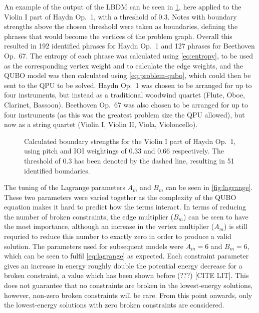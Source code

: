 \documentclass[12pt]{article}
\theoremstyle{definition}
\begin{document}
An example of the output of the LBDM can be seen in \cref{fig:phrase-extraction}, here applied to the Violin I part of Haydn Op.\ 1, with a threshold of \num{0.3}. Notes with boundary strengths above the chosen threshold were taken as boundaries, defining the phrases that would become the vertices of the problem graph. Overall this resulted in \num{192} identified phrases for Haydn Op.\ 1 and \num{127} phrases for Beethoven Op.\ 67. The entropy of each phrase was calculated using \cref{eq:entropy}, to be used as the corresponding vertex weight and to calculate the edge weights, and the QUBO model was then calculated using \cref{eq:problem-qubo}, which could then be sent to the QPU to be solved. Haydn Op.\ 1 was chosen to be arranged for up to four instruments, but instead as a traditional woodwind quartet (Flute, Oboe, Clarinet, Bassoon). Beethoven Op.\ 67 was also chosen to be arranged for up to four instruments (as this was the greatest problem size the QPU allowed), but now as a string quartet (Violin I, Violin II, Viola, Violoncello).

\begin{figure}[h]
    \small
    
    \caption{Calculated boundary strengths for the Violin I part of Haydn Op.\ 1, using pitch and IOI weightings of \num{0.33} and \num{0.66} respectively. The threshold of \num{0.3} has been denoted by the dashed line, resulting in \num{51} identified boundaries.}
    \label{fig:phrase-extraction}
\end{figure}

The tuning of the Lagrange parameters $A_m$ and $B_m$ can be seen in \cref{fig:lagrange}. These two parameters were varied together as the complexity of the QUBO equation makes it hard to predict how the terms interact. In terms of reducing the number of broken constraints, the edge multiplier ($B_m$) can be seen to have the most importance, although an increase in the vertex multiplier ($A_m$) is still requried to reduce this number to exactly zero in order to produce a valid solution. The parameters used for subsequent models were $A_m=6$ and $B_m=6$, which can be seen to fulfil \cref{eq:lagrange} as expected. Each constraint parameter gives an increase in energy roughly double the potential energy decrease for a broken constraint, a value which has been shown before (???) [CITE LIT]. This does not guarantee that no constraints are broken in the lowest-energy solutions, however, non-zero broken constraints will be rare. From this point onwards, only the lowest-energy solutions with zero broken constraints are considered.
\end{document}
